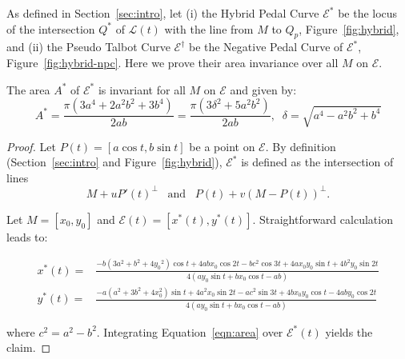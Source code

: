 As defined in Section~\ref{sec:intro}, let (i) the Hybrid Pedal Curve $\mathcal{E}^*$ be the locus of the intersection $Q^*$ of $\mathcal{L}(t)$ with the line from $M$ to $Q_p$, Figure~\ref{fig:hybrid}, and (ii) the Pseudo Talbot Curve $\mathcal{E}^\dagger$ be  the Negative Pedal Curve of $\mathcal{E}^*$, Figure~\ref{fig:hybrid-npc}. Here we prove their area invariance over all $M$ on $\mathcal{E}$.

\begin{theorem}
	The area $A^*$ of $\mathcal{E}^*$ is invariant for all $M$ on $\mathcal{E}$ and given by:
	\[ A^*= \frac{\pi  (3a^4+2a^2b^2+3b^4)}{2 a b}=\frac{\pi(3\delta^2+5a^2b^2)}{2 a b},\;\; \delta=\sqrt{a^4-a^2b^2+b^4}
	\]
\end{theorem}

\begin{proof}

Let $P(t)=[a\cos{t},b\sin{t}]$ be a point on $\mathcal{E}$. By definition (Section~\ref{sec:intro} and  Figure~\ref{fig:hybrid}), $\mathcal{E}^*$ is defined as the intersection of lines
\[ M+ uP'(t)^{\perp}\;\;\; \text{and}\;\;\; P(t)+v (M-P(t))^{\perp}.\]

\noindent Let $M=[x_0,y_0]$ and $\mathcal{E}(t)=[x^*(t),y^*(t)]$. Straightforward calculation leads to:

{\small
\begin{align*}
x^*(t)=&\frac{
-b\left(3{a}^{2}+{b}^{2}+4{y_0}^{2}\right)\cos{t}
+4{a}{b}{x_0}\cos{2{t}}
-b c^2 \cos{3{t}}
+4{a}{x_0}{y_0}\sin{t}
+4{b}^{2}{y_0}\sin{2{t}}
}{
4\left(a{y_0}\sin{t}+b{x_0}\cos{t}-{a}{b}\right)
}\\
y^*(t)=&\frac{
-a\left({a}^{2}+3{b}^{2}+4{x_0^{2}}\right)\sin{t}
+4{a}^{2}{x_0}\sin{2{t}}
-a c^2\sin{3{t}}
+4{b}{x_0}{y_0}\cos{t}
-4{a}{b}{y_0}\cos{2{t}}
}{
4\left(a{y_0}\sin{t}+b{x_0}\cos{t}-{a}{b}\right)
}
\end{align*}
}

\noindent where $c^2=a^2-b^2$. Integrating Equation~\ref{eqn:area} over $\mathcal{E}^*(t)$ yields the claim.
\end{proof}

